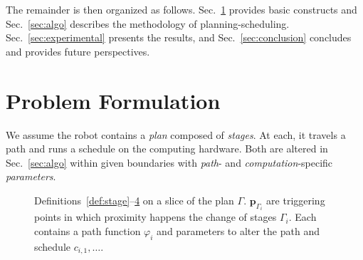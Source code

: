 \documentclass[letterpaper,10pt,conference,twoside]{IEEEtran}
\newcommand{\figpath}{./figures}
\theoremstyle{definition}
\begin{document}
The %
{\color{black}remainder is} then organized as follows. Sec.~\ref{sec:prob} provides basic constructs%
{ \color{black}and} %
Sec.~\ref{sec:algo} describes %
the methodology of planning-scheduling. Sec.~\ref{sec:experimental} presents the results, %
and Sec.~\ref{sec:conclusion} concludes and provides future perspectives. %


\section{Problem Formulation}  %
\label{sec:prob}               %
{\color{black}W}e assume %
{\color{black}the }robot contains a \emph{plan} composed of \emph{stages}. At each, %
{\color{black}it }travels a path and runs a schedule on the computing hardware. Both are %
altered in Sec.~\ref{sec:algo} within given boundaries with \emph{path}- and \emph{computation}-specific \emph{parameters}.%

\begin{figure}[t]
  \footnotesize
  \begin{minipage}[t]{0.65\columnwidth}
    \centering
    
  \end{minipage}
  \begin{minipage}[t]{0.012\columnwidth}
  \end{minipage}\hfill
  \begin{minipage}[t]{0.328\columnwidth}
    \vspace*{-28.2ex}
    \caption{Definitions~\ref{def:stage}--\hyperref[def:plan]{4} on a slice of the plan $\Gamma$. $\mathbf{p}_{\Gamma_i}$ are triggering points in which proximity happens {\color{black}the} change of stages $\Gamma_i$. Each contains a path function $\varphi_i$ and parameters to alter the path and schedule $c_{i,1},\dots$.}
    \label{fig:traj1}
  \end{minipage}
  \vspace*{-4ex}
\end{figure}
\end{document}
